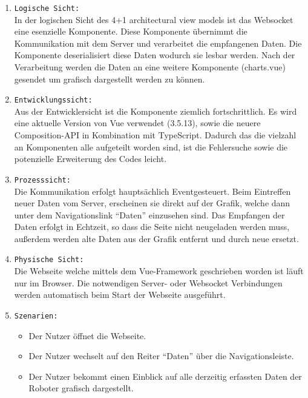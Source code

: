 \begin{enumerate}
  \item \texttt{Logische Sicht:} \\
  In der logischen Sicht des 4+1 architectural view models ist das Websocket eine esenzielle Komponente.
  Diese Komponente übernimmt die Kommunikation mit dem Server und verarbeitet die empfangenen Daten.
  Die Komponente deserialisiert diese Daten wodurch sie lesbar werden. Nach der Verarbeitung werden die Daten an 
  eine weitere Komponente (charts.vue) gesendet um grafisch dargestellt werden zu können.
  \item \texttt{Entwicklungssicht:} \\
  Aus der Entwicklersicht ist die Komponente ziemlich fortschrittlich.
  Es wird eine aktuelle Version von Vue verwendet (3.5.13), sowie die neuere Composition-API in Kombination mit TypeScript.
  Dadurch das die vielzahl an Komponenten alle aufgeteilt worden sind,
  ist die Fehlersuche sowie die potenzielle Erweiterung des Codes leicht.
  \item \texttt{Prozesssicht:} \\
  Die Kommunikation erfolgt hauptsächlich Eventgesteuert. 
  Beim Eintreffen neuer Daten vom Server, erscheinen sie direkt auf der Grafik, 
  welche dann unter dem Navigationslink ``Daten'' einzusehen sind.
  Das Empfangen der Daten erfolgt in Echtzeit, so dass die Seite nicht neugeladen werden muss, 
  außerdem werden alte Daten aus der Grafik entfernt und durch neue ersetzt.
  \item \texttt{Physische Sicht:} \\
  Die Webseite welche mittels dem Vue-Framework geschrieben worden ist läuft nur im Browser.
  Die notwendigen Server- oder Websocket Verbindungen werden automatisch beim Start der Webseite ausgeführt.
  \item \texttt{Szenarien:} \\
    \begin{itemize}
      \renewcommand{\labelitemi}{$\Rightarrow$}
    \item Der Nutzer öffnet die Webseite.
    \item Der Nutzer wechselt auf den Reiter ``Daten'' über die Navigationsleiste.
    \item Der Nutzer bekommt einen Einblick auf alle derzeitig erfassten Daten der Roboter grafisch dargestellt.
    \end{itemize}
\end{enumerate}

